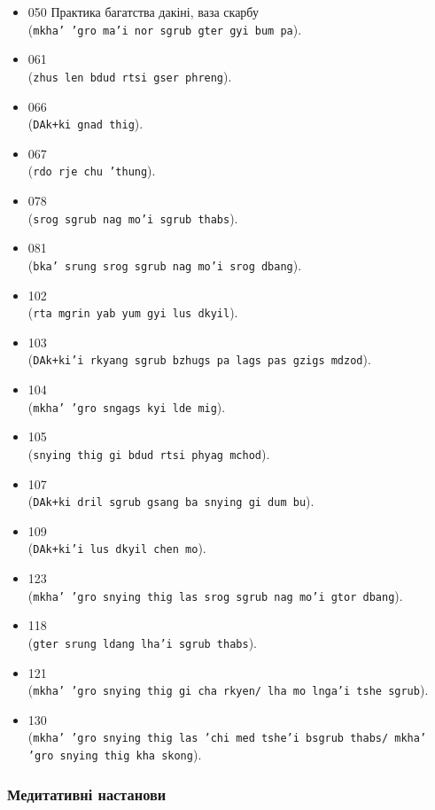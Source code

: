 \documentclass{article}
\begin{document}
\begin{itemize}
\item 050 Практика багатства дакіні, ваза скарбу \\ (\texttt{mkha' 'gro ma'i nor sgrub gter gyi bum pa}).
\item 061  \\ (\texttt{zhus len bdud rtsi gser phreng}).
\item 066  \\ (\texttt{DAk+ki gnad thig}).
\item 067  \\ (\texttt{rdo rje chu 'thung}).
\item 078  \\ (\texttt{srog sgrub nag mo'i sgrub thabs}).
\item 081  \\ (\texttt{bka' srung srog sgrub nag mo'i srog dbang}).
\item 102  \\ (\texttt{rta mgrin yab yum gyi lus dkyil}).
\item 103  \\ (\texttt{DAk+ki'i rkyang sgrub bzhugs pa lags pas gzigs mdzod}).
\item 104  \\ (\texttt{mkha' 'gro sngags kyi lde mig}).
\item 105  \\ (\texttt{snying thig gi bdud rtsi phyag mchod}).
\item 107  \\ (\texttt{DAk+ki dril sgrub gsang ba snying gi dum bu}).
\item 109  \\ (\texttt{DAk+ki'i lus dkyil chen mo}).
\item 123  \\ (\texttt{mkha' 'gro snying thig las srog sgrub nag mo'i gtor dbang}).
\item 118  \\ (\texttt{gter srung ldang lha'i sgrub thabs}).
\item 121  \\ (\texttt{mkha' 'gro snying thig gi cha rkyen/ lha mo lnga'i tshe sgrub}).
\item 130  \\ (\texttt{mkha' 'gro snying thig las 'chi med tshe'i bsgrub thabs/ mkha' 'gro snying thig kha skong}).
\end{itemize}
\endgroup

\subsubsection{Медитативні настанови}
\end{document}
